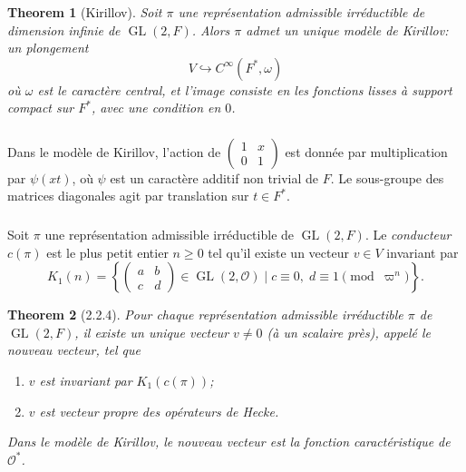 \documentclass[11pt,a4paper]{amsart}
\theoremstyle{plain}
\newtheorem{theorem}{Theorem}[section]
\theoremstyle{definition}
\theoremstyle{remark}
\DeclareMathOperator{\GL}{GL}
\newcommand{\cO}{\mathcal{O}}
\begin{document}
\begin{theorem}[Kirillov] \label{thm:kirillov}
Soit $\pi$ une repr\'esentation admissible irr\'eductible de dimension infinie de $\GL(2,F)$. Alors $\pi$ admet un unique mod\`ele de Kirillov: un plongement
\[ V \hookrightarrow C^\infty(F^*, \omega) \]
o\`u $\omega$ est le caract\`ere central, et l'image consiste en les fonctions lisses \`a support compact sur $F^*$, avec une condition en $0$.
\end{theorem}

\subsubsection{}
\label{sec:2.2.2}

Dans le mod\`ele de Kirillov, l'action de $\begin{pmatrix} 1 & x \\ 0 & 1 \end{pmatrix}$ est donn\'ee par multiplication par $\psi(xt)$, o\`u $\psi$ est un caract\`ere additif non trivial de $F$. Le sous-groupe des matrices diagonales agit par translation sur $t \in F^*$.

\subsubsection{}
\label{sec:2.2.3}

Soit $\pi$ une repr\'esentation admissible irr\'eductible de $\GL(2,F)$. Le \emph{conducteur} $c(\pi)$ est le plus petit entier $n \geq 0$ tel qu'il existe un vecteur $v \in V$ invariant par
\[ K_1(n) = \left\{ \begin{pmatrix} a & b \\ c & d \end{pmatrix} \in \GL(2,\cO) \mid c \equiv 0, \; d \equiv 1 \pmod{\varpi^n} \right\}. \]

\begin{theorem}[2.2.4] \label{thm:2.2.4}
Pour chaque repr\'esentation admissible irr\'eductible $\pi$ de $\GL(2,F)$, il existe un unique vecteur $v \neq 0$ (\`a un scalaire pr\`es), appel\'e le \emph{nouveau vecteur}, tel que
\begin{enumerate}
\item[(i)] $v$ est invariant par $K_1(c(\pi))$;
\item[(ii)] $v$ est vecteur propre des op\'erateurs de Hecke.
\end{enumerate}
Dans le mod\`ele de Kirillov, le nouveau vecteur est la fonction caract\'eristique de $\cO^*$.
\end{theorem}
\end{document}

